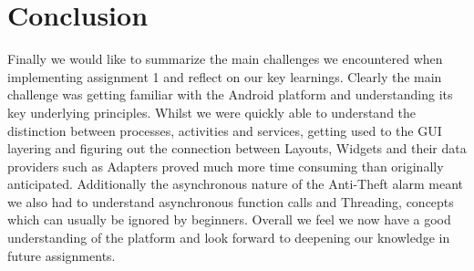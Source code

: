 \documentclass{report}
\begin{document}
\section{Conclusion}

Finally we would like to summarize the main challenges we encountered when implementing assignment 1 and reflect on our key learnings. Clearly the main challenge was getting familiar with the Android platform and understanding its key underlying principles. Whilst we were quickly able to understand the distinction between processes, activities and services, getting used to the GUI layering and figuring out the connection between Layouts, Widgets and their data providers such as Adapters proved much more time consuming than originally anticipated. Additionally the asynchronous nature of the Anti-Theft alarm meant we also had to understand asynchronous function calls and Threading, concepts which can usually be ignored by beginners. Overall we feel we now have a good understanding of the platform and look forward to deepening our knowledge in future assignments.



\end{document}

